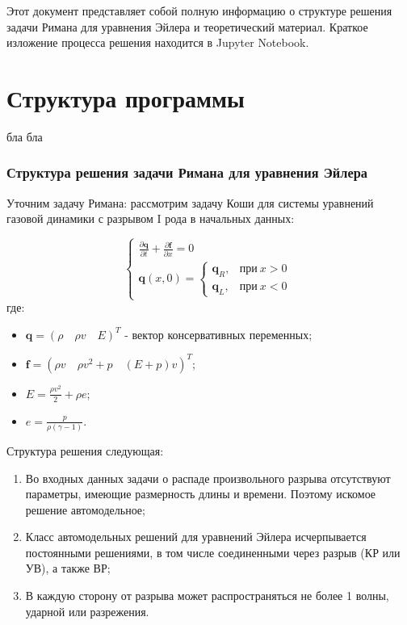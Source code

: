 Этот документ представляет собой полную информацию о структуре решения задачи Римана для уравнения Эйлера и теоретический материал. Краткое изложение процесса решения находится в Jupyter Notebook.

\newpage

\part{Структура программы}\label{part_structure}

бла бла

\section{Структура решения задачи Римана для уравнения Эйлера}\label{sect_structure}

Уточним задачу Римана: рассмотрим задачу Коши для системы уравнений газовой динамики с разрывом I рода в начальных данных:

\begin{equation}
	\begin{cases}
		\frac{\partial \pmb{q}}{\partial t} + \frac{\partial \pmb{f}}{\partial x} = 0\\
		\pmb{q}(x, 0) =
		\begin{cases}
			\pmb{q}_R,&\text{при}\ x>0\\
			\pmb{q}_L,&\text{при}\ x<0
		\end{cases}
	\end{cases}
\end{equation}
где:
\begin{itemize}
	\item $\pmb{q} = (\rho\quad \rho v\quad E)^T$ - вектор консервативных переменных;
	\item $\pmb{f} = (\rho v\quad \rho v^2 + p\quad (E+p)v)^T$;
	\item $E = \frac{\rho v^2}{2} + \rho e$;
	\item $e = \frac{p}{\rho(\gamma - 1)}$.
\end{itemize}

Структура решения следующая:
\begin{enumerate}
	\item Во входных данных задачи о распаде произвольного разрыва отсутствуют параметры, имеющие размерность длины и времени. Поэтому искомое решение автомодельное;
	\item Класс автомодельных решений для уравнений Эйлера исчерпывается постоянными решениями, в том числе соединенными через разрыв (КР или УВ), а также ВР;
	\item В каждую сторону от разрыва может распространяться не более 1 волны, ударной или разрежения.
\end{enumerate}

